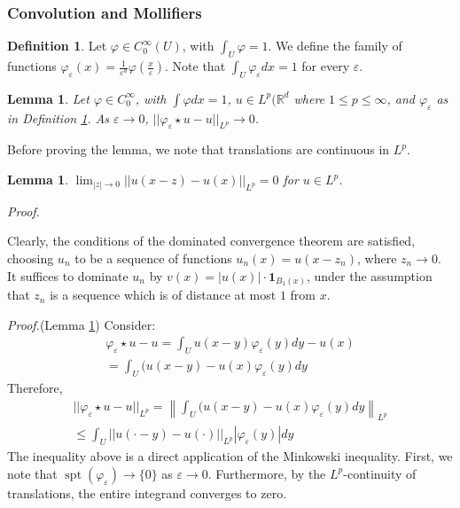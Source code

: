 \documentclass[letterpaper,10pt]{article}
\DeclareMathOperator{\spt}{spt}
\theoremstyle{definition}
\newtheorem{dfn}{Definition}
\theoremstyle{remark}
\theoremstyle{plain}
\newtheorem{lem}[thm]{Lemma}
\newenvironment{proofm}{
    \vspace{5pt}
    \begin{mdframed}[
        bottomline=false,topline=false,rightline=false, linecolor=red,linewidth=2pt, skipabove=0
    ]
    \noindent\textit{Proof.}
}{
    \hspace{\fill}\qedsymbol\end{mdframed}
}
\renewenvironment{proof}{
    \vspace{5pt}
    \begin{mdframed}[bottomline=false,topline=false,rightline=false, skipabove=0]
    \noindent\textit{Proof.}}
{
    \hspace{\fill}\qedsymbol
    \end{mdframed}
}
\begin{document}
\subsubsection{Convolution and Mollifiers}
\begin{dfn}\label{dfn:mollifier}
    Let $\varphi\in C^\infty_0(U)$, with $\int_{U}^{}\varphi=1$.
    We define the family of functions $\varphi_\varepsilon(x)=\frac{1}{\varepsilon^d}\varphi\left(\frac{x}{\varepsilon}\right)$.
    Note that $\int_{U}^{}\varphi_\varepsilon dx=1$ for every $\varepsilon$.
\end{dfn}
\begin{lem}\label{lem:mollifier}
    Let $\varphi\in C^\infty_0$, with $\int\varphi dx=1$, $u\in L^p(\mathbb R^d$ 
    where $1\leq p\leq\infty$, and $\varphi_\varepsilon$ as in Definition \ref{dfn:mollifier}.
    As $\varepsilon\rightarrow 0$, $||\varphi_\varepsilon\star u-u||_{L^p}\rightarrow 0$.
\end{lem}
Before proving the lemma, we note that translations are continuous in $L^p$.
\begin{lem}\label{lem:transcont}
    $\lim_{|z|\rightarrow 0}||u(x-z)-u(x)||_{L^p}=0$ for $u\in L^p$.
\end{lem}
\begin{proofm}
    Clearly, the conditions of the dominated convergence theorem are satisfied,
    choosing $u_n$ to be a sequence of functions $u_n(x)=u(x-z_n)$, where $z_n\rightarrow 0$.
    It suffices to dominate $u_n$ by $v(x)=|u(x)|\cdot\mathbf 1_{B_1(x)}$, under the assumption
    that $z_n$ is a sequence which is of distance at most $1$ from $x$.
\end{proofm}
\begin{proof}(Lemma \ref{lem:mollifier})
    Consider:
    \begin{align*}
        \varphi_\varepsilon\star u-u=\int_{U}^{}u(x-y)\varphi_\varepsilon(y)dy-u(x)
        \\
        =\int_{U}^{}(u(x-y)-u(x)\varphi_\varepsilon(y)dy
    \end{align*}
    Therefore,
    \begin{align*}
        ||\varphi_\varepsilon\star u-u||_{L^p}
        =\left\|\int_{U}^{}(u(x-y)-u(x)\varphi_\varepsilon(y)dy\right\|_{L^p}
        \\
        \leq\int_{U}^{}||u(\cdot-y)-u(\cdot)||_{L^p}|\varphi_\varepsilon(y)|dy
    \end{align*}
    The inequality above is a direct application of the Minkowski inequality. %
    First, we note that $\spt(\varphi_\varepsilon)\rightarrow\{0\}$ as $\varepsilon\rightarrow 0$.
    Furthermore, by the $L^p$-continuity of translations, the entire integrand 
    converges to zero.
\end{proof}
\end{document}
